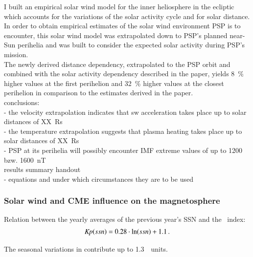 I built an empirical solar wind model for the inner heliosphere in the ecliptic which accounts for the variations of the solar activity cycle and for solar distance. In order to obtain empirical estimates of the solar wind environment PSP is to encounter, this solar wind model was extrapolated down to PSP's planned near-Sun perihelia and was built to consider the expected solar activity during PSP's mission.\\

The newly derived distance dependency, extrapolated to the PSP orbit and combined with the solar activity dependency described in the paper, yields \SI{8}{\%} higher values at the first perihelion and \SI{32}{\%} higher values at the closest perihelion in comparison to the estimates derived in the paper.\\

conclusions:\\
- the velocity extrapolation indicates that sw acceleration takes place up to solar distances of XX~Rs\\
- the temperature extrapolation suggests that plasma heating takes place up to solar distances of XX~Rs\\
- PSP at its perihelia will possibly encounter IMF extreme values of up to 1200 bzw. 1600~nT\\


results summary handout\\
- equations and under which circumstances they are to be used\\


\subsubsection*{Solar wind and CME influence on the magnetosphere}

Relation between the yearly averages of the previous year's SSN and the \Kp~index:
\begin{align}
	\textit{Kp}(ssn) = 0.28 \cdot \ln(ssn) + 1.1	\,.
\end{align}

The seasonal variations in \Kp{} contribute up to 1.3~\Kp~units.\\

